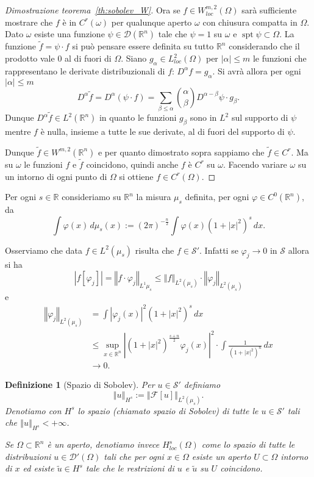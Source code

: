 \documentclass[italian,a4paper,oneside,headinclude]{scrbook}
\renewcommand{\phi}{\varphi}
\newcommand{\loc}{\mathit{loc}}
\newcommand{\D}{\mathcal D}
\newcommand{\F}{\mathcal F}
\renewcommand{\S}{\mathcal S}
\newcommand{\RR}{\mathbb R}
\newcommand{\abs}[1]{{\left|#1\right|}}
\newcommand{\Abs}[1]{{\left\Vert #1\right\Vert}}
\newcommand{\defeq}{:=}
\DeclareMathOperator{\spt}{spt}
\newtheorem{definition}[theorem]{Definizione}
\begin{document}
\begin{proof}[Dimostrazione teorema~\ref{th:sobolev_W}]
    Ora se $f\in W^{m,2}_\loc(\Omega)$ sarà sufficiente mostrare che
    $f$ è in $C^r(\omega)$ per qualunque aperto $\omega$ con chiusura
    compatta in $\Omega$. Dato $\omega$ esiste una funzione
    $\psi\in\D(\RR^n)$ tale che $\psi = 1$ su $\omega$
    e $\spt \psi \subset \Omega$. La funzione $\tilde f = \psi\cdot f$ si può
    pensare essere definita su tutto $\RR^n$ considerando che il
    prodotto vale $0$ al di fuori di $\Omega$.
    Siano $g_\alpha \in L^2_\loc(\Omega)$ per $\abs{\alpha}\le m$
    le funzioni che rappresentano le derivate distribuzionali di $f$:
    $D^\alpha f = g_\alpha$.
    Si avrà allora per ogni
    $\abs{\alpha}\le m$
    \[
    D^\alpha \tilde f
    = D^\alpha (\psi\cdot f)
    = \sum_{\beta \le \alpha}{\alpha \choose \beta}
          D^{\alpha-\beta} \psi \cdot g_{\beta}.
    \]
    Dunque $D^\alpha \tilde f \in L^2(\RR^n)$ in quanto le funzioni
    $g_{\beta}$ sono in $L^2$ sul supporto di $\psi$ mentre $f$
    è nulla,
    insieme a tutte le sue derivate,
    al di fuori del supporto di $\psi$.

    Dunque $\tilde f \in W^{m,2}(\RR^n)$
    e per quanto dimostrato sopra sappiamo che $\tilde f \in C^r$. Ma
    su $\omega$ le funzioni $f$ e $\tilde f$ coincidono, quindi anche
    $f$ è $C^r$ su $\omega$. Facendo variare $\omega$ su un intorno di
    ogni punto di $\Omega$ si ottiene $f\in C^r(\Omega)$.
  \end{proof}


  Per ogni $s\in \RR$ consideriamo su $\RR^n$ la misura $\mu_s$
  definita, per ogni $\phi \in C^0(\RR^n)$, da
  \[
  \int \phi(x) \, d\mu_s(x)
  \defeq (2\pi)^{-\frac n 2}\int \phi(x) (1+\abs{x}^2)^s\, dx.
  \]

  Osserviamo che data $f\in L^2(\mu_s)$ risulta che $f\in \S'$.
  Infatti se $\phi_j\to 0$ in $\S$ allora si ha
  \[
  \abs{f[\phi_j]}
  = \Abs{f \cdot \phi_j}_{L^1{\mu_s}}
  \le \Abs{f}_{L^2(\mu_s)} \cdot \Abs{\phi_j}_{L^2(\mu_s)}
  \]
  e
  \begin{align*}
    \Abs{\phi_j}_{L^2(\mu_s)}
    &= \int \abs{\phi_j(x)}^2(1+\abs{x}^2)^s\, dx\\
    &\le \sup_{x\in \RR^n} \abs{(1+\abs{x}^2)^{\frac{s+n}{2}}\phi_j(x)}^2
   \cdot \int \frac{1}{(1+\abs{x}^2)^{n}}\, dx \\
    &\to 0.
  \end{align*}


  \begin{definition}[Spazio di Sobolev]
    Per $u\in \S'$ definiamo
    \[
    \Abs{u}_{H^s} \defeq \Abs{\F[u]}_{L^2(\mu_s)}.
    \]
    Denotiamo con $H^s$ lo spazio (chiamato \emph{spazio di Sobolev})
    di tutte le $u\in \S'$ tali che $\Abs{u}_{H^s}< +\infty$.

    Se $\Omega\subset \RR^n$ è un aperto, denotiamo invece $H^s_\loc(\Omega)$
    come
    lo spazio di tutte le distribuzioni $u\in\D'(\Omega)$ tali che per ogni
    $x\in \Omega$ esiste un aperto $U\subset \Omega$ intorno di $x$ ed
    esiste $\tilde u \in H^s$ tale che le restrizioni di $u$ e
    $\tilde u$ su $U$ coincidono.
  \end{definition}
\end{document}
